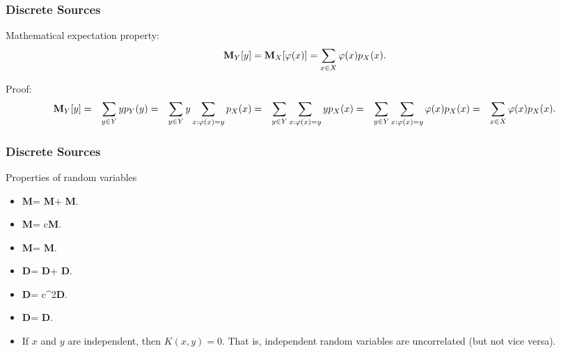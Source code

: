 \documentclass[14pt]{beamer}
\begin{document}
\begin{frame}
\frametitle{Discrete Sources}
\begin{itemize}
\small{    
    
    \item Mathematical expectation property:
    \begin{equation}
    {\rm {\bf M}}_Y [y] = {\rm {\bf M}}_X [\varphi (x)] = \sum\limits_{x \in X}
    {\varphi (x)p_X (x)}.
    \end{equation}
    
    \item Proof:
    \begin{eqnarray}
    {\rm {\bf M}}_Y [y]&=& \sum\limits_{y \in Y} y p_Y (y) 
    &=&\sum\limits_{y \in Y} y\sum\limits_{x:\varphi (x) = y} p_X (x)
    &=&\sum\limits_{y \in Y} \sum\limits_{x:\varphi (x) = y} y p_X (x)
    &=&\sum\limits_{y \in Y} \sum\limits_{x:\varphi (x) = y} \varphi
    (x)p_X (x)
    & =&\sum\limits_{x \in X} {\varphi (x)p_X (x)} \nonumber.
    \end{eqnarray}
}
\end{itemize}
\end{frame}


\begin{frame}
\frametitle{Discrete Sources}
Properties of random variables
\begin{itemize}
    \item{ {\rm {\bf M}}\left[ {x + y} \right] = {\rm {\bf M}}\left[ x \right] + {\rm {\bf M}}\left[ y \right].
    }
    
    \item{ {\rm {\bf M}}\left[ {cx} \right] = c{\rm {\bf M}}\left[ x \right].
    }
    
    \item{ {\rm {\bf M}}\left[ {xy} \right] = {\rm {\bf M}}\left[ y \right].
    }
    
    \item{ {\rm {\bf D}}\left[ {x + y} \right] = {\rm {\bf D}}\left[ x \right] + {\rm {\bf D}}\left[ y \right].
    }
    
    \item{ {\rm {\bf D}}\left[ {cx} \right] = c^2{\rm {\bf D}}\left[ x \right].
    }
    
    \item{ {\rm {\bf D}}\left[ {c + x} \right] = {\rm {\bf D}}\left[ x \right].
    }
    
    \item{ If $x$ and $y$ are independent, then $K(x,y) = 0$. That is, independent random variables are uncorrelated (but not vice versa). 
    }

\end{itemize}
\end{frame}
\end{document}
